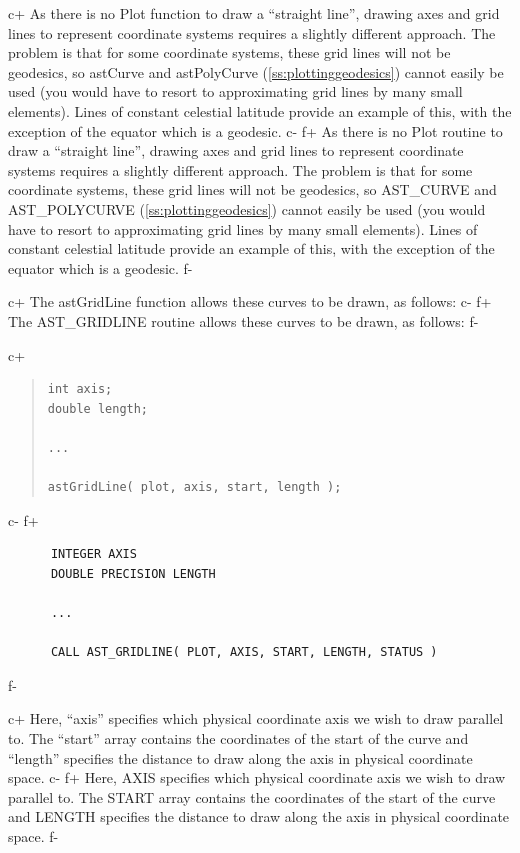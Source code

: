 \documentclass[twoside,11pt]{article}
\newcommand{\secref}[1]{\S\ref{#1}}
\renewcommand{\secref}[1]{\ref{#1}}
\begin{document}
c+
As there is no Plot function to draw a ``straight line'', drawing axes
and grid lines to represent coordinate systems requires a slightly
different approach. The problem is that for some coordinate systems,
these grid lines will not be geodesics, so astCurve and astPolyCurve
(\secref{ss:plottinggeodesics}) cannot easily be used (you would have
to resort to approximating grid lines by many small elements). Lines
of constant celestial latitude provide an example of this, with the
exception of the equator which is a geodesic.
c-
f+
As there is no Plot routine to draw a ``straight line'', drawing axes
and grid lines to represent coordinate systems requires a slightly
different approach. The problem is that for some coordinate systems,
these grid lines will not be geodesics, so AST\_CURVE and
AST\_POLYCURVE (\secref{ss:plottinggeodesics}) cannot easily be used
(you would have to resort to approximating grid lines by many small
elements). Lines of constant celestial latitude provide an example of
this, with the exception of the equator which is a geodesic.
f-

c+
The astGridLine function allows these curves to be drawn, as follows:
c-
f+
The AST\_GRIDLINE routine allows these curves to be drawn, as follows:
f-

c+
\begin{quote}
\small
\begin{verbatim}
int axis;
double length;

...

astGridLine( plot, axis, start, length );
\end{verbatim}
\normalsize
\end{quote}
c-
f+
\small
\begin{verbatim}
      INTEGER AXIS
      DOUBLE PRECISION LENGTH

      ...

      CALL AST_GRIDLINE( PLOT, AXIS, START, LENGTH, STATUS )
\end{verbatim}
\normalsize
f-

c+
Here, ``axis'' specifies which physical coordinate axis we wish to
draw parallel to. The ``start'' array contains the coordinates of the
start of the curve and ``length'' specifies the distance to draw along
the axis in physical coordinate space.
c-
f+
Here, AXIS specifies which physical coordinate axis we wish to draw
parallel to. The START array contains the coordinates of the start of
the curve and LENGTH specifies the distance to draw along the axis in
physical coordinate space.
f-
\end{document}
